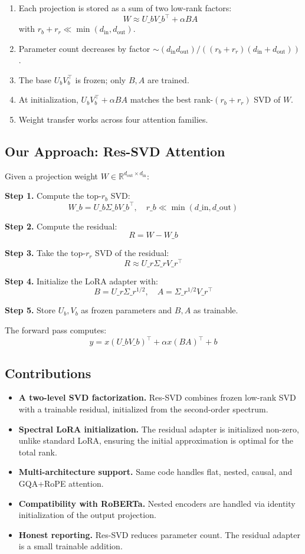 \begin{enumerate}
\item Each projection is stored as a sum of two low-rank factors:
  $$
  W \approx U\_b V\_b^\top + \alpha B A
  \tag{1.1}
  $$
  with $r_b + r_r \ll \min(d_\text{in}, d_\text{out})$.
\item Parameter count decreases by factor $\sim (d_\text{in} d_\text{out}) / ((r_b + r_r)(d_\text{in} + d_\text{out}))$.
\item The base $U_b V_b^\top$ is frozen; only $B, A$ are trained.
\item At initialization, $U_b V_b^\top + \alpha B A$ matches the best rank-$(r_b + r_r)$
  SVD of $W$.
\item Weight transfer works across four attention families.

\end{enumerate}
\subsection{Our Approach: Res-SVD Attention}

Given a projection weight $W \in \mathbb{R}^{d_\text{out} \times d_\text{in}}$:

\textbf{Step 1.} Compute the top-$r_b$ SVD:
\[
W\_b = U\_b \Sigma\_b V\_b^\top, \quad r\_b \ll \min(d\_\text{in}, d\_\text{out})
\tag{1.2}
\]

\textbf{Step 2.} Compute the residual:
\[
R = W - W\_b
\tag{1.3}
\]

\textbf{Step 3.} Take the top-$r_r$ SVD of the residual:
\[
R \approx U\_r \Sigma\_r V\_r^\top
\tag{1.4}
\]

\textbf{Step 4.} Initialize the LoRA adapter with:
\[
B = U\_r \Sigma\_r^{1/2}, \quad A = \Sigma\_r^{1/2} V\_r^\top
\tag{1.5}
\]

\textbf{Step 5.} Store $U_b, V_b$ as frozen parameters and $B, A$ as trainable.

The forward pass computes:
\[
y = x (U\_b V\_b)^\top + \alpha x (B A)^\top + b
\tag{1.6}
\]

\subsection{Contributions}

\begin{itemize}
\item \textbf{A two-level SVD factorization.} Res-SVD combines frozen low-rank SVD
  with a trainable residual, initialized from the second-order spectrum.
\item \textbf{Spectral LoRA initialization.} The residual adapter is initialized
  non-zero, unlike standard LoRA, ensuring the initial approximation is
  optimal for the total rank.
\item \textbf{Multi-architecture support.} Same code handles flat, nested, causal,
  and GQA+RoPE attention.
\item \textbf{Compatibility with RoBERTa.} Nested encoders are handled via
  identity initialization of the output projection.
\item \textbf{Honest reporting.} Res-SVD reduces parameter count. The residual
  adapter is a small trainable addition.

\end{itemize}
